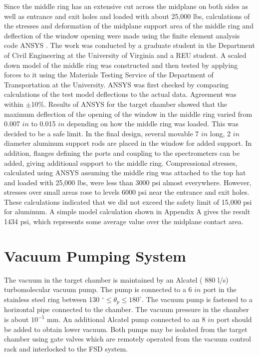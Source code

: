 {{Since the middle ring has an extensive cut across the midplane on both sides as
well as
entrance and exit holes and loaded with about 25,000 lbs, calculations of the
stresses
 and deformation of  the
midplane support area of the middle ring and deflection of the window opening
were made using the finite element analysis code ANSYS . The work was conducted
by a graduate student in the Department of Civil Engineering at the
University of
Virginia and a REU student.  A scaled down model of the middle ring was
constructed and then tested by applying forces to it using the Materials Testing
Service of the Department of Transportation at the University. ANSYS was first
checked by comparing calculations of the test model deflections to the actual
data. Agreement was  within $\pm$10\%. Results of ANSYS for the target
chamber showed that the maximum deflection of the opening of the window in the
middle ring varied from 0.007 $in$ to 0.015 $in$ depending on how the
middle ring
was loaded. This was decided to be a safe limit. In the final design, several
movable
7 $in$ long, 2 $in$ diameter aluminum support rods are placed in the
window for added support. In addition, flanges defining the ports and
coupling to
the spectrometers can be added, giving additional support to the middle ring.
Compressional stresses, calculated using ANSYS assuming the middle ring was
attached to the
top hat and loaded with 25,000 lbs, were less than 3000 psi 
almost everywhere.
However, stresses over small areas rose to levels 6000 psi near the entrance
and exit holes. These calculations indicated that we did not exceed the safety
limit of 15,000 psi for aluminum. A simple model calculation shown in Appendix
A  gives the result 1434 psi, which represents some average value over the
midplane
contact area.

\section{Vacuum Pumping System}

The vacuum in the target chamber is maintained by an Alcatel ( 880 l/s)
 turbomolecular vacuum pump. The pump is connected to a 6 $in$ port in the
stainless steel ring between 130
 $^\circ \le \theta_p \le 180 ^\circ$. The vacuum pump is
fastened to a horizontal pipe connected to the chamber. The vacuum pressure in
the chamber is about $10^{-5}$ mm. An additional Alcatel pump connected
to an 8 $in$ port should be added to obtain lower vacuum. Both
pumps may be isolated
from the target chamber using gate valves which are remotely operated
from the vacuum control rack and interlocked to the FSD system.


}}
